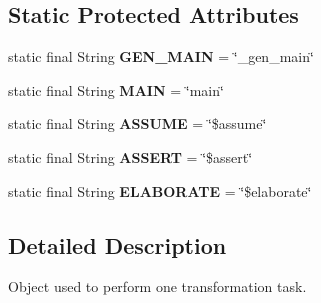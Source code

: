 \subsection*{Static Protected Attributes}
\begin{DoxyCompactItemize}
\item 
\hypertarget{classedu_1_1udel_1_1cis_1_1vsl_1_1civl_1_1transform_1_1common_1_1BaseWorker_af47a05df8f15b1b9fdda749e2da32ef8}{}static final String {\bfseries G\+E\+N\+\_\+\+M\+A\+I\+N} = \char`\"{}\+\_\+gen\+\_\+main\char`\"{}\label{classedu_1_1udel_1_1cis_1_1vsl_1_1civl_1_1transform_1_1common_1_1BaseWorker_af47a05df8f15b1b9fdda749e2da32ef8}

\item 
\hypertarget{classedu_1_1udel_1_1cis_1_1vsl_1_1civl_1_1transform_1_1common_1_1BaseWorker_af041743753b5980860bb0be4ac2039e3}{}static final String {\bfseries M\+A\+I\+N} = \char`\"{}main\char`\"{}\label{classedu_1_1udel_1_1cis_1_1vsl_1_1civl_1_1transform_1_1common_1_1BaseWorker_af041743753b5980860bb0be4ac2039e3}

\item 
\hypertarget{classedu_1_1udel_1_1cis_1_1vsl_1_1civl_1_1transform_1_1common_1_1BaseWorker_aaa1bbbc9b52071f90fbd27be91e6ece0}{}static final String {\bfseries A\+S\+S\+U\+M\+E} = \char`\"{}\$assume\char`\"{}\label{classedu_1_1udel_1_1cis_1_1vsl_1_1civl_1_1transform_1_1common_1_1BaseWorker_aaa1bbbc9b52071f90fbd27be91e6ece0}

\item 
\hypertarget{classedu_1_1udel_1_1cis_1_1vsl_1_1civl_1_1transform_1_1common_1_1BaseWorker_ab8766f089f3a852fc5db7cb9873b5d88}{}static final String {\bfseries A\+S\+S\+E\+R\+T} = \char`\"{}\$assert\char`\"{}\label{classedu_1_1udel_1_1cis_1_1vsl_1_1civl_1_1transform_1_1common_1_1BaseWorker_ab8766f089f3a852fc5db7cb9873b5d88}

\item 
\hypertarget{classedu_1_1udel_1_1cis_1_1vsl_1_1civl_1_1transform_1_1common_1_1BaseWorker_ab967bb952146d7489cb30c929bc0ba04}{}static final String {\bfseries E\+L\+A\+B\+O\+R\+A\+T\+E} = \char`\"{}\$elaborate\char`\"{}\label{classedu_1_1udel_1_1cis_1_1vsl_1_1civl_1_1transform_1_1common_1_1BaseWorker_ab967bb952146d7489cb30c929bc0ba04}

\end{DoxyCompactItemize}


\subsection{Detailed Description}
Object used to perform one transformation task. 


